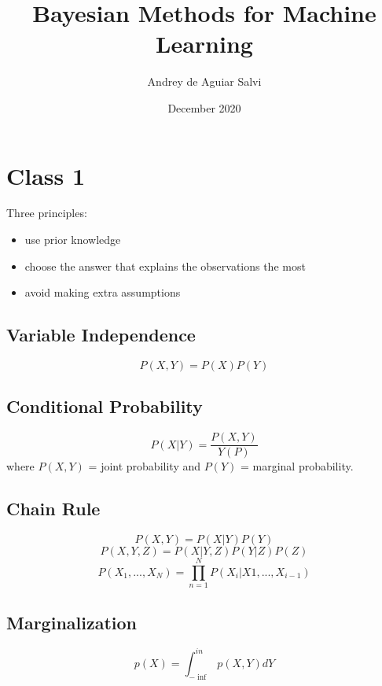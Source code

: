 \documentclass{article}
\title{Bayesian Methods for Machine Learning}
\author{Andrey de Aguiar Salvi}
\date{December 2020}
\begin{document}
\maketitle

\section{Class 1}
Three principles:
\begin{itemize}
    \item use prior knowledge
	\item choose the answer that explains the observations the most
    \item avoid making extra assumptions
\end{itemize}
		
\subsection{Variable Independence}
\begin{equation}
	P(X, Y) = P(X)P(Y)
\end{equation}
	
\subsection{Conditional Probability}
\begin{equation}
    P(X|Y) = \frac{P(X, Y)}{Y(P)}
\end{equation}
where $P(X, Y)$ = joint probability and $P(Y)$ = marginal probability.
		
\subsection{Chain Rule}
\begin{equation}
    P(X,Y) = P(X|Y)P(Y)
\end{equation}
\begin{equation}
	P(X, Y, Z) = P(X|Y, Z)P(Y|Z)P(Z)
\end{equation}
\begin{equation}
	P(X_1, ..., X_N) = \prod_{n=1}^{N} P(X_i|X1, ..., X_{i-1})
\end{equation}
		
\subsection{Marginalization}
\begin{equation}	
	p(X) = \int_{-\inf}^{in} p(X, Y)dY
\end{equation}
		
\end{document}
